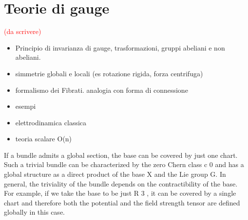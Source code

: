 \chapter{Teorie di gauge}
\textcolor{red}{(da scrivere)}\\
\begin{itemize}
   \item Principio di invarianza di gauge, trasformazioni, gruppi abeliani e non abeliani.\\
   \item simmetrie globali e locali (es rotazione rigida, forza centrifuga)\\
   \item formalismo dei Fibrati. analogia con forma di connessione\\
   \item esempi\\
   \item elettrodinamica classica\\
   \item teoria scalare O(n)\\
\end{itemize}
If a bundle admits a global section, the base can be covered by just one
chart. Such a trivial bundle can be characterized by the zero Chern class c 0
and has a global structure as a direct product of the base X and the Lie group
G. In general, the triviality of the bundle depends on the contractibility of
the base. For example, if we take the base to be just R 3 , it can be covered
by a single chart and therefore both the potential and the field strength
tensor are defined globally in this case.\\
